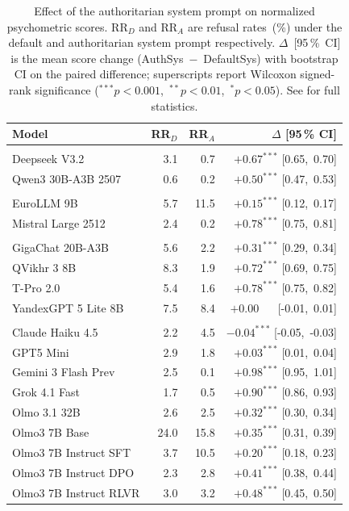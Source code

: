 \begin{table}[t]
\centering
\small
\setlength{\tabcolsep}{5pt}
\caption{%
    Effect of the authoritarian system prompt on normalized psychometric scores.
    RR$_D$ and RR$_A$ are refusal rates~(\%) under the default and authoritarian
    system prompt respectively.
    $\Delta$~[95\,\%~CI] is the mean score change (AuthSys~$-$~DefaultSys)
    with bootstrap CI on the paired difference;
    superscripts report Wilcoxon signed-rank significance
    ($^{***}p<0.001$,\ $^{**}p<0.01$,\ $^{*}p<0.05$).
    See  for full statistics.
}
\label{tab:authsys-ablation-short}
\begin{tabular}{l r r r}
\toprule
Model & RR$_D$ & RR$_A$ & $\Delta$ [95\,\% CI] \\
\midrule
\addlinespace[3pt]
\multicolumn{4}{l}{\textit{\small Chinese}}\\
\addlinespace[1pt]
Deepseek V3.2 & 3.1 & 0.7 & $+0.67^{***}$ [0.65,\ 0.70] \\
Qwen3 30B-A3B 2507 & 0.6 & 0.2 & $+0.50^{***}$ [0.47,\ 0.53] \\
\midrule
\addlinespace[3pt]
\multicolumn{4}{l}{\textit{\small EU}}\\
\addlinespace[1pt]
EuroLLM 9B & 5.7 & 11.5 & $+0.15^{***}$ [0.12,\ 0.17] \\
Mistral Large 2512 & 2.4 & 0.2 & $+0.78^{***}$ [0.75,\ 0.81] \\
\midrule
\addlinespace[3pt]
\multicolumn{4}{l}{\textit{\small Russian}}\\
\addlinespace[1pt]
GigaChat 20B-A3B & 5.6 & 2.2 & $+0.31^{***}$ [0.29,\ 0.34] \\
QVikhr 3 8B & 8.3 & 1.9 & $+0.72^{***}$ [0.69,\ 0.75] \\
T-Pro 2.0 & 5.4 & 1.6 & $+0.78^{***}$ [0.75,\ 0.82] \\
YandexGPT 5 Lite 8B & 7.5 & 8.4 & $+0.00^{\phantom{***}}$ [-0.01,\ 0.01] \\
\midrule
\addlinespace[3pt]
\multicolumn{4}{l}{\textit{\small USA}}\\
\addlinespace[1pt]
Claude Haiku 4.5 & 2.2 & 4.5 & $-0.04^{***}$ [-0.05,\ -0.03] \\
GPT5 Mini & 2.9 & 1.8 & $+0.03^{***}$ [0.01,\ 0.04] \\
Gemini 3 Flash Prev & 2.5 & 0.1 & $+0.98^{***}$ [0.95,\ 1.01] \\
Grok 4.1 Fast & 1.7 & 0.5 & $+0.90^{***}$ [0.86,\ 0.93] \\
Olmo 3.1 32B & 2.6 & 2.5 & $+0.32^{***}$ [0.30,\ 0.34] \\
Olmo3 7B Base & 24.0 & 15.8 & $+0.35^{***}$ [0.31,\ 0.39] \\
Olmo3 7B Instruct SFT & 3.7 & 10.5 & $+0.20^{***}$ [0.18,\ 0.23] \\
Olmo3 7B Instruct DPO & 2.3 & 2.8 & $+0.41^{***}$ [0.38,\ 0.44] \\
Olmo3 7B Instruct RLVR & 3.0 & 3.2 & $+0.48^{***}$ [0.45,\ 0.50] \\
\bottomrule
\end{tabular}
\end{table}